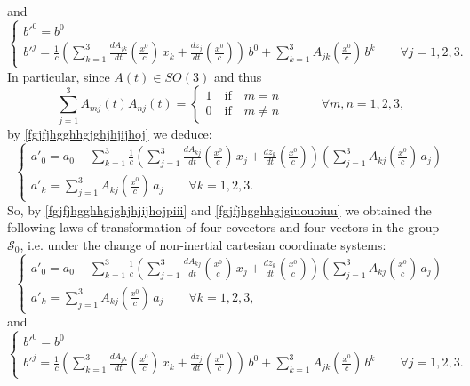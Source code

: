 \documentclass{article}
\theoremstyle{definition}
\theoremstyle{remark}
\newcommand{\er}{\eqref}
\newcommand{\er}{\eqref}
\begin{document}
and
\begin{equation}\label{fgjfjhgghhgjgiuouoiuu}
\begin{cases}
b'^0=b^0
\\
b'^j=\frac{1}{c}\left(\sum\limits_{k=1}^{3}\frac{dA_{jk}}{dt}\left(\frac{x^0}{c}\right)\,x_k+\frac{d
z_j}{dt}\left(\frac{x^0}{c}\right)\right)\,b^0+\sum_{k=1}^{3}A_{jk}\left(\frac{x^0}{c}\right)\,b^k\quad\quad\forall
j=1,2,3.
\end{cases}
\end{equation}
In particular, since $A(t)\in SO(3)$ and thus
\begin{equation}\label{fgjfjhgghhgjgiuouoiuu1}
\sum_{j=1}^{3}A_{mj}(t)A_{nj}(t)=\begin{cases}1\quad\text{if}\quad m=n\\
0\quad\text{if}\quad m\neq n
\end{cases}
\quad\quad\quad\forall m,n=1,2,3,
\end{equation}
by \er{fgjfjhgghhgjghjhjijhoj} we deduce:
\begin{equation}\label{fgjfjhgghhgjghjhjijhojpiii}
\begin{cases}
a'_0=a_0-\sum_{k=1}^{3}\frac{1}{c}\left(\sum\limits_{j=1}^{3}\frac{dA_{kj}}{dt}\left(\frac{x^0}{c}\right)\,x_j+\frac{d
z_k}{dt}\left(\frac{x^0}{c}\right)\right)\left(\sum_{j=1}^{3}A_{kj}\left(\frac{x^0}{c}\right)\,a_j\right)
\\
a'_k=\sum_{j=1}^{3}A_{kj}\left(\frac{x^0}{c}\right)\,a_j\quad\quad\forall
k=1,2,3.
\end{cases}
\end{equation}
So, by \er{fgjfjhgghhgjghjhjijhojpiii} and
\er{fgjfjhgghhgjgiuouoiuu} we obtained the following laws of
transformation of four-covectors and four-vectors in the group
$\mathcal{S}_0$, i.e. under the change of non-inertial cartesian
coordinate systems:
\begin{equation}\label{fgjfjhgghhgjghjhjijhojpiiihjhj}
\begin{cases}
a'_0=a_0-\sum_{k=1}^{3}\frac{1}{c}\left(\sum\limits_{j=1}^{3}\frac{dA_{kj}}{dt}\left(\frac{x^0}{c}\right)\,x_j+\frac{d
z_k}{dt}\left(\frac{x^0}{c}\right)\right)\left(\sum_{j=1}^{3}A_{kj}\left(\frac{x^0}{c}\right)\,a_j\right)
\\
a'_k=\sum_{j=1}^{3}A_{kj}\left(\frac{x^0}{c}\right)\,a_j\quad\quad\forall
k=1,2,3,
\end{cases}
\end{equation}
and
\begin{equation}\label{fgjfjhgghhgjgiuouoiuujkjkjk}
\begin{cases}
b'^0=b^0
\\
b'^j=\frac{1}{c}\left(\sum\limits_{k=1}^{3}\frac{dA_{jk}}{dt}\left(\frac{x^0}{c}\right)\,x_k+\frac{d
z_j}{dt}\left(\frac{x^0}{c}\right)\right)\,b^0+\sum_{k=1}^{3}A_{jk}\left(\frac{x^0}{c}\right)\,b^k\quad\quad\forall
j=1,2,3.
\end{cases}
\end{equation}
\end{document}
